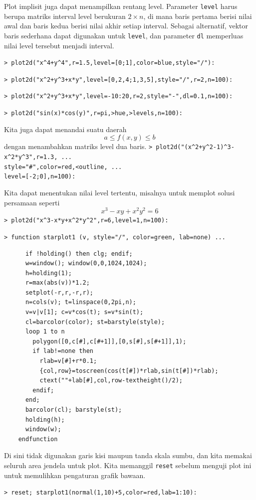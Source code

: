\documentclass[11pt, a4paper]{article}
\newcommand{\emtcmd}[1]{\noindent\texttt{\textcolor{emtcommand}{>}\ #1}\par\smallskip}
\begin{document}
Plot implisit juga dapat menampilkan rentang level. Parameter \texttt{level} harus berupa matriks interval level berukuran $2 \times n$, di mana baris pertama berisi nilai awal dan baris kedua berisi nilai akhir setiap interval. Sebagai alternatif, vektor baris sederhana dapat digunakan untuk \texttt{level}, dan parameter \texttt{dl} memperluas nilai level tersebut menjadi interval.

\emtcmd{plot2d("x\^{}4+y\^{}4",r=1.5,level=[0;1],color=blue,style="/"):}
\emtcmd{plot2d("x\^{}2+y\^{}3+x*y",level=[0,2,4;1,3,5],style="/",r=2,n=100):}
\emtcmd{plot2d("x\^{}2+y\^{}3+x*y",level=-10:20,r=2,style="-",dl=0.1,n=100):}
\emtcmd{plot2d("sin(x)*cos(y)",r=pi,>hue,>levels,n=100):}

Kita juga dapat menandai suatu daerah
$$a \le f(x,y) \le b$$
dengan menambahkan matriks level dua baris.
\emtcmd{plot2d("(x\^{}2+y\^{}2-1)\^{}3-x\^{}2*y\^{}3",r=1.3, ... \\
\hspace*{1em} style="\#",color=red,<outline, ... \\
\hspace*{1em} level=[-2;0],n=100):}

Kita dapat menentukan nilai level tertentu, misalnya untuk memplot solusi persamaan seperti
$$x^3-xy+x^2y^2=6$$
\emtcmd{plot2d("x\^{}3-x*y+x\^{}2*y\^{}2",r=6,level=1,n=100):}

\emtcmd{function starplot1 (v, style="/", color=green, lab=none) ...}
\begin{verbatim}
      if !holding() then clg; endif;
      w=window(); window(0,0,1024,1024);
      h=holding(1);
      r=max(abs(v))*1.2;
      setplot(-r,r,-r,r);
      n=cols(v); t=linspace(0,2pi,n);
      v=v|v[1]; c=v*cos(t); s=v*sin(t);
      cl=barcolor(color); st=barstyle(style);
      loop 1 to n
        polygon([0,c[#],c[#+1]],[0,s[#],s[#+1]],1);
        if lab!=none then
          rlab=v[#]+r*0.1;
          {col,row}=toscreen(cos(t[#])*rlab,sin(t[#])*rlab);
          ctext(""+lab[#],col,row-textheight()/2);
        endif;
      end;
      barcolor(cl); barstyle(st);
      holding(h);
      window(w);
    endfunction
\end{verbatim}

Di sini tidak digunakan garis kisi maupun tanda skala sumbu, dan kita memakai seluruh area jendela untuk plot. Kita memanggil \texttt{reset} sebelum menguji plot ini untuk memulihkan pengaturan grafik bawaan.

\emtcmd{reset; starplot1(normal(1,10)+5,color=red,lab=1:10):}
\end{document}
